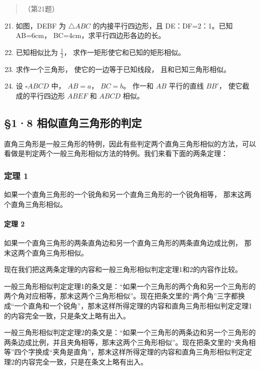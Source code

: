 \begin{quote}
（第21题）
\end{quote}

\begin{enumerate}
\setcounter{enumi}{20}
\item
  如图，DEBF 为 \(\triangle ABC\) 的内接平行四边形，且 DE：DF=2：1。已知
  AB=6cm， BC=4cm，求平行四边形各边的长。
\item
  已知相似比为 \(\frac{1}{2}\)， 求作一矩形使它和已知的矩形相似。
\item
  求作一个三角形， 使它的一边等于已知线段， 且和已知三角形相似。
\item
  设 \(\square ABCD\) 中， \(AB = a\)， \(BC = b\)。 作一和 \(AB\)
  平行的直线 \(BB'\)， 使它截成的平行四边形 \(ABEF\) 和 \(ABCD\) 相似。
\end{enumerate}

\subsection{§1·8
相似直角三角形的判定}

直角三角形是一般三角形的特例，因此有些判定两个直角三角形相似的方法，可以看做是判定两个一般三角形相似方法的特例。我们来看下面的两条定理：

\subsubsection{定理 1}

如果一个直角三角形的一个锐角和另一个直角三角形的一个锐角相等，
那末这两个直角三角形相似。

\paragraph{定理 2}

如果一个直角三角形的两条直角边和另一个直角三角形的两条直角边成比例，
那末这两个直角三角形相似。

现在我们把这两条定理的内容和一般三角形相似判定定理1和2的内容作比较。

一般三角形相似判定定理1的条文是：``如果一个三角形的两个角和另一个三角形的两个角对应相等，那末这两个三角形相似''。现在把条文里的``两个角''三字都换成``一个直角和一个锐角''，那末这样所得定理的内容和直角三角形相似判定定理1的内容完全一致，只是条文上略有出入。

一般三角形相似判定定理2的条文是：``如果一个三角形的两条边和另一个三角形的两条边成比例，并且夹角相等，那末这两个三角形相似''。现在把条文里的``夹角相等''四个字换成``夹角是直角''，那末这样所得定理的内容和直角三角形相似判定定理2的内容完全一致，只是在条文上略有出入。

